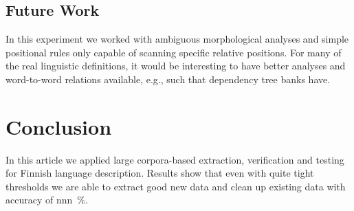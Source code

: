 \documentclass[a5paper]{article}
\begin{document}
\subsection{Future Work}

In this experiment we worked with ambiguous morphological analyses and simple
positional rules only capable of scanning specific relative
positions. For many of the real linguistic definitions, it would be interesting
to have better analyses and word-to-word relations available, e.g., such that
dependency tree banks have.

\section{Conclusion}

In this article we applied large corpora-based extraction, verification and
testing for Finnish language description. Results show that even with quite
tight thresholds we are able to extract good new data and clean up existing
data with accuracy of nnn~\%.



\end{document}
